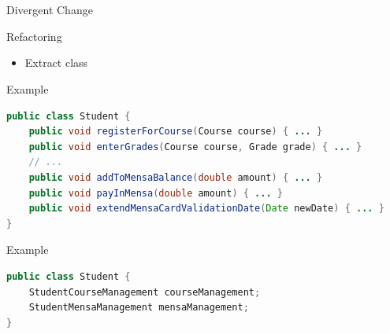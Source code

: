 \begin{frame}[fragile]
	\frametitle{\insertsubsection\ } %
	\begin{fancycolumns}
		\begin{definition}{Divergent Change}
			\small
		\end{definition}
		\begin{definition}{Refactoring}
			\begin{itemize}
				\item Extract class
			\end{itemize}
		\end{definition}
		\nextcolumn
		\begin{example}{Example}
			\begin{lstlisting}[language=Java, basicstyle=\small]
public class Student {
	public void registerForCourse(Course course) { ... }
	public void enterGrades(Course course, Grade grade) { ... }
	// ...
	public void addToMensaBalance(double amount) { ... }
	public void payInMensa(double amount) { ... }
	public void extendMensaCardValidationDate(Date newDate) { ... }
}
			\end{lstlisting}
		\end{example}

		\begin{example}{Example}
			\vspace{-3mm}
			\begin{lstlisting}[language=Java, basicstyle=\small]
public class Student {
	StudentCourseManagement courseManagement;
	StudentMensaManagement mensaManagement;
}
			\end{lstlisting}
			\vspace{-3mm}
		\end{example}
	\end{fancycolumns}
\end{frame}

